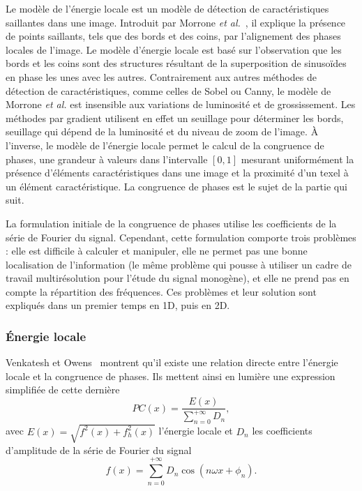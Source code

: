 Le modèle de l'énergie locale est un modèle de détection de caractéristiques saillantes dans une image. Introduit par Morrone \textit{et al.}~\cite{morrone_feature_1987, morrone_mach_1986}, il explique la présence de points saillants, tels que des bords et des coins, par l'alignement des phases locales de l'image. Le modèle d'énergie locale est basé sur l'observation que les bords et les coins sont des structures résultant de la superposition de sinusoïdes en phase les unes avec les autres. Contrairement aux autres méthodes de détection de caractéristiques, comme celles de Sobel ou Canny, le modèle de Morrone \textit{et al.} est insensible aux variations de luminosité et de grossissement. Les méthodes par gradient utilisent en effet un seuillage pour déterminer les bords, seuillage qui dépend de la luminosité et du niveau de zoom de l'image. À l'inverse, le modèle de l'énergie locale permet le calcul de la congruence de phases, une grandeur à valeurs dans l'intervalle $[0, 1]$ mesurant uniformément la présence d'éléments caractéristiques dans une image et la proximité d'un texel à un élément caractéristique. La congruence de phases est le sujet de la partie qui suit.

\bigskip

La formulation initiale de la congruence de phases utilise les coefficients de la série de Fourier du signal. Cependant, cette formulation comporte trois problèmes : elle est difficile à calculer et manipuler, elle ne permet pas une bonne localisation de l'information (le même problème qui pousse à utiliser un cadre de travail multirésolution pour l'étude du signal monogène), et elle ne prend pas en compte la répartition des fréquences. Ces problèmes et leur solution sont expliqués dans un premier temps en 1D, puis en 2D.

\subsubsection{Énergie locale}

Venkatesh et Owens~\cite{venkatesh_energy_1989} montrent qu'il existe une relation directe entre l'énergie locale et la congruence de phases. Ils mettent ainsi en lumière une expression simplifiée de cette dernière
\begin{equation}
    PC(x) = \frac{E(x)}{\sum_{n=0}^{+\infty} D_n},
\end{equation}
avec $E(x) = \sqrt{f^2(x) + f_h^2(x)}$ l'énergie locale et $D_n$ les coefficients d'amplitude de la série de Fourier du signal
\begin{equation}
    f(x) = \sum_{n=0}^{+\infty} D_n\cos(n\omega x + \phi_n).
    \label{eq:phase-congruence-energy}
\end{equation}


